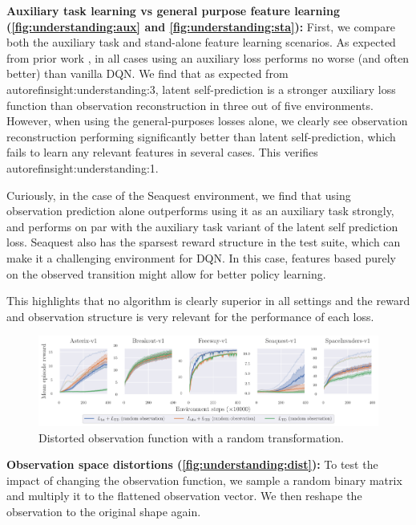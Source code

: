 \textbf{Auxiliary task learning vs general purpose feature learning (\autoref{fig:understanding:aux} and \autoref{fig:understanding:sta}):}
First, we compare both the auxiliary task and stand-alone feature learning scenarios.
As expected from prior work \parencite{jaderberg2016reinforcement,schwarzer2021dataefficient,farebrother2023protovalue}, in all cases using an auxiliary loss performs no worse (and often better) than vanilla DQN.
We find that as expected from \\autoref{insight:understanding:3}, latent self-prediction is a stronger auxiliary loss function than observation reconstruction in three out of five environments.
However, when using the general-purposes losses alone, we clearly see observation reconstruction performing significantly better than latent self-prediction, which fails to learn any relevant features in several cases. This verifies \\autoref{insight:understanding:1}.

Curiously, in the case of the Seaquest environment, we find that using observation prediction alone outperforms using it as an auxiliary task strongly, and performs on par with the auxiliary task variant of the latent self prediction loss.
Seaquest also has the sparsest reward structure in the test suite, which can make it a challenging environment for DQN. In this case, features based purely on the observed transition might allow for better policy learning.

This highlights that no algorithm is clearly superior in all settings and the reward and observation structure is very relevant for the performance of each loss.


\begin{figure}[t]
    \centering
    \includegraphics[width=\textwidth]{figures/understanding/rlc2024-distorted-fixed_minatar.pdf}
    \caption{Distorted observation function with a random transformation.}
    \label{fig:understanding:dist}
\end{figure}

\textbf{Observation space distortions (\autoref{fig:understanding:dist}):} To test the impact of changing the observation function, we sample a random binary matrix and multiply it to the flattened observation vector. We then reshape the observation to the original shape again.


